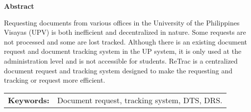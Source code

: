 \begin{center}
\textbf{Abstract}
\end{center}
\setlength{\parindent}{0pt}
Requesting documents from various offices in the University of the Philippines Visayas (UPV) is both inefficient and decentralized in nature. Some requests are not processed and some are lost tracked. Although there is an existing document request and document tracking system in the UP system, it is only used at the administration level and is not accessible for students. ReTrac is a centralized document request and tracking system designed to make the requesting and tracking or request more efficient.



\begin{tabular}{lp{4.25in}}
\hspace{-0.5em}\textbf{Keywords:}\hspace{0.25em} & Document request, tracking system, DTS, DRS.\\
\end{tabular}

